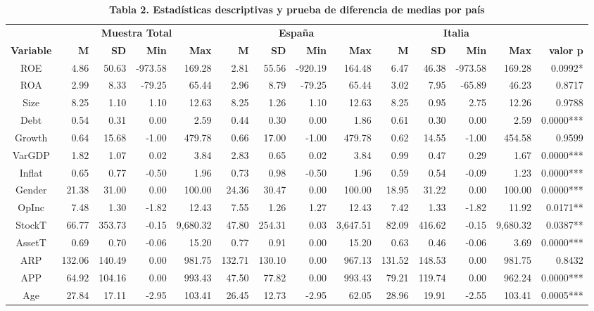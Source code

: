 \documentclass[
]{article}
\begin{document}
\begin{table}[!t]
\caption*{
{\large \textbf{Tabla 2. Estadísticas descriptivas y prueba de
diferencia de medias por país}}
} 
\fontsize{5.2pt}{6.3pt}\selectfont
\begin{tabular*}{\linewidth}{@{\extracolsep{\fill}}crrrrrrrrrrrrr}
\toprule
 & \multicolumn{4}{c}{\textbf{Muestra Total}} & \multicolumn{4}{c}{\textbf{España}} & \multicolumn{4}{c}{\textbf{Italia}} &  \\ 
\cmidrule(lr){2-5} \cmidrule(lr){6-9} \cmidrule(lr){10-13}
\textbf{Variable} & \textbf{M} & \textbf{SD} & \textbf{Min} & \textbf{Max} & \textbf{M} & \textbf{SD} & \textbf{Min} & \textbf{Max} & \textbf{M} & \textbf{SD} & \textbf{Min} & \textbf{Max} & \textbf{valor p} \\ 
\midrule\addlinespace[2.5pt]
ROE & 4.86 & 50.63 & -973.58 & 169.28 & 2.81 & 55.56 & -920.19 & 164.48 & 6.47 & 46.38 & -973.58 & 169.28 & 0.0992* \\ 
ROA & 2.99 & 8.33 & -79.25 & 65.44 & 2.96 & 8.79 & -79.25 & 65.44 & 3.02 & 7.95 & -65.89 & 46.23 & 0.8717 \\ 
Size & 8.25 & 1.10 & 1.10 & 12.63 & 8.25 & 1.26 & 1.10 & 12.63 & 8.25 & 0.95 & 2.75 & 12.26 & 0.9788 \\ 
Debt & 0.54 & 0.31 & 0.00 & 2.59 & 0.44 & 0.30 & 0.00 & 1.86 & 0.61 & 0.30 & 0.00 & 2.59 & 0.0000*** \\ 
Growth & 0.64 & 15.68 & -1.00 & 479.78 & 0.66 & 17.00 & -1.00 & 479.78 & 0.62 & 14.55 & -1.00 & 454.58 & 0.9599 \\ 
VarGDP & 1.82 & 1.07 & 0.02 & 3.84 & 2.83 & 0.65 & 0.02 & 3.84 & 0.99 & 0.47 & 0.29 & 1.67 & 0.0000*** \\ 
Inflat & 0.65 & 0.77 & -0.50 & 1.96 & 0.73 & 0.98 & -0.50 & 1.96 & 0.59 & 0.54 & -0.09 & 1.23 & 0.0000*** \\ 
Gender & 21.38 & 31.00 & 0.00 & 100.00 & 24.36 & 30.47 & 0.00 & 100.00 & 18.95 & 31.22 & 0.00 & 100.00 & 0.0000*** \\ 
OpInc & 7.48 & 1.30 & -1.82 & 12.43 & 7.55 & 1.26 & 1.27 & 12.43 & 7.42 & 1.33 & -1.82 & 11.92 & 0.0171** \\ 
StockT & 66.77 & 353.73 & -0.15 & 9,680.32 & 47.80 & 254.31 & 0.03 & 3,647.51 & 82.09 & 416.62 & -0.15 & 9,680.32 & 0.0387** \\ 
AssetT & 0.69 & 0.70 & -0.06 & 15.20 & 0.77 & 0.91 & 0.00 & 15.20 & 0.63 & 0.46 & -0.06 & 3.69 & 0.0000*** \\ 
ARP & 132.06 & 140.49 & 0.00 & 981.75 & 132.71 & 130.10 & 0.00 & 967.13 & 131.52 & 148.53 & 0.00 & 981.75 & 0.8432 \\ 
APP & 64.92 & 104.16 & 0.00 & 993.43 & 47.50 & 77.82 & 0.00 & 993.43 & 79.21 & 119.74 & 0.00 & 962.24 & 0.0000*** \\ 
Age & 27.84 & 17.11 & -2.95 & 103.41 & 26.45 & 12.73 & -2.95 & 62.05 & 28.96 & 19.91 & -2.55 & 103.41 & 0.0005*** \\ 
\bottomrule
\end{tabular*}
\end{table}
\end{document}
